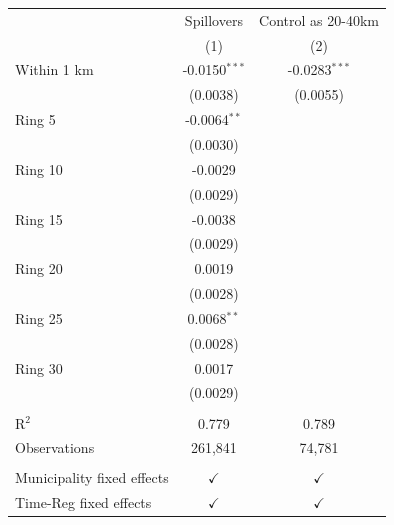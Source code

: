 \begingroup
\centering
\begin{tabular}{lcc}
   \toprule
                                 & Spillovers      & Control as 20-40km \\   
                                 & (1)             & (2)\\  
   \midrule 
   Within 1 km                   & -0.0150$^{***}$ & -0.0283$^{***}$\\   
                                 & (0.0038)        & (0.0055)\\   
   Ring 5                        & -0.0064$^{**}$  &   \\   
                                 & (0.0030)        &   \\   
   Ring 10                       & -0.0029         &   \\   
                                 & (0.0029)        &   \\   
   Ring 15                       & -0.0038         &   \\   
                                 & (0.0029)        &   \\   
   Ring 20                       & 0.0019          &   \\   
                                 & (0.0028)        &   \\   
   Ring 25                       & 0.0068$^{**}$   &   \\   
                                 & (0.0028)        &   \\   
   Ring 30                       & 0.0017          &   \\   
                                 & (0.0029)        &   \\   
    \\
   R$^2$                         & 0.779           & 0.789\\  
   Observations                  & 261,841         & 74,781\\  
    \\
   Municipality fixed effects & $\checkmark$    & $\checkmark$\\   
   Time-Reg fixed effects     & $\checkmark$    & $\checkmark$\\   
   \bottomrule
\end{tabular}
\par\endgroup
